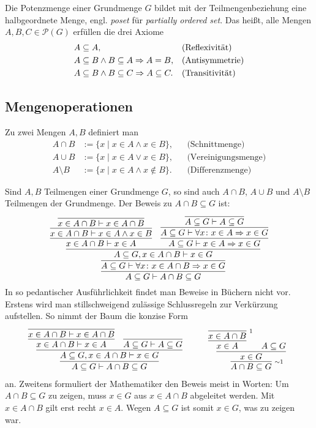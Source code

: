 Die Potenzmenge einer Grundmenge $G$ bildet mit der Teilmengenbeziehung
eine halbgeordnete Menge, engl. \emph{poset} für
\emph{partially ordered set}. Das heißt, alle Mengen
$A,B,C\in\mathcal P(G)$ erfüllen die drei Axiome
\begin{align*}
& A\subseteq A, &&\text{(Reflexivität)}\\
& A\subseteq B\land B\subseteq A\Rightarrow A = B, &&\text{(Antisymmetrie)}\\
& A\subseteq B\land B\subseteq C\Rightarrow A\subseteq C. &&\text{(Transitivität)}
\end{align*}

\newpage
\subsection{Mengenoperationen}

\begin{Definition}\newlinefirst
Zu zwei Mengen $A,B$ definiert man
\begin{align*}
A\cap B &:= \{x\mid x\in A\land x\in B\}, && \text{(Schnittmenge)}\\
A\cup B &:= \{x\mid x\in A\lor x\in B\}, && \text{(Vereinigungsmenge)}\\
A\setminus B &:= \{x\mid x\in A\land x\notin B\}. && \text{(Differenzmenge)}
\end{align*}
\end{Definition}
Sind $A,B$ Teilmengen einer Grundmenge $G$, so sind auch
$A\cap B$, $A\cup B$ und $A\setminus B$ Teilmengen der Grundmenge.
Der Beweis zu $A\cap B\subseteq G$ ist:
\[
\infer{A\subseteq G\vdash A\cap B\subseteq G}{
  \infer{A\subseteq G\vdash\forall x\colon x\in A\cap B\cond x\in G}{
    \infer{A\subseteq G, x\in A\cap B\vdash x\in G}{
      \infer{x\in A\cap B\vdash x\in A}{
        \infer{x\in A\cap B\vdash x\in A\land x\in B}{
          \infer{x\in A\cap B\vdash x\in A\cap B}{}}}
    & \infer{A\subseteq G\vdash x\in A\cond x\in G}{
        \infer{A\subseteq G\vdash \forall x\colon x\in A\cond x\in G}{
          \infer{A\subseteq G\vdash A\subseteq G}{}}}}}}
\]
In so pedantischer Ausführlichkeit findet man Beweise in Büchern
nicht vor. Erstens wird man stillschweigend zulässige Schlussregeln zur
Verkürzung aufstellen. So nimmt der Baum die konzise Form
\[
\begin{array}{@{}l@{\qquad\quad}l}
\infer{A\subseteq G\vdash A\cap B\subseteq G}{
  \infer{A\subseteq G,x\in A\cap B\vdash x\in G}{
    \infer{x\in A\cap B\vdash x\in A}{
      \infer{x\in A\cap B\vdash x\in A\cap B}{}}
  & \infer{A\subseteq G\vdash A\subseteq G}{}}}
&
\infer[\infernote{$\sim$1}]{A\cap B\subseteq G}{
  \infer{x\in G}{
    \infer{x\in A}{
      \infer[\infernote{1}]{x\in A\cap B}{}}
  & A\subseteq G}}
\end{array}
\]
an. Zweitens formuliert der Mathematiker den Beweis meist in Worten:
Um $A\cap B\subseteq G$ zu zeigen, muss $x\in G$ aus $x\in A\cap B$
abgeleitet werden. Mit $x\in A\cap B$ gilt erst recht $x\in A$.
Wegen $A\subseteq G$ ist somit $x\in G$, was zu zeigen war.\,\qedsymbol

